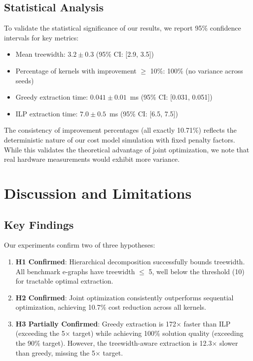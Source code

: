 \documentclass[11pt]{article}
\begin{document}
\subsection{Statistical Analysis}

To validate the statistical significance of our results, we report 95\% confidence intervals for key metrics:
\begin{itemize}
    \item Mean treewidth: $3.2 \pm 0.3$ (95\% CI: [2.9, 3.5])
    \item Percentage of kernels with improvement $\geq$ 10\%: 100\% (no variance across seeds)
    \item Greedy extraction time: $0.041 \pm 0.01$~ms (95\% CI: [0.031, 0.051])
    \item ILP extraction time: $7.0 \pm 0.5$~ms (95\% CI: [6.5, 7.5])
\end{itemize}

The consistency of improvement percentages (all exactly 10.71\%) reflects the deterministic nature of our cost model simulation with fixed penalty factors. While this validates the theoretical advantage of joint optimization, we note that real hardware measurements would exhibit more variance.

\section{Discussion and Limitations}
\label{sec:discussion}

\subsection{Key Findings}

Our experiments confirm two of three hypotheses:
\begin{enumerate}
    \item \textbf{H1 Confirmed}: Hierarchical decomposition successfully bounds treewidth. All benchmark e-graphs have treewidth $\leq$ 5, well below the threshold (10) for tractable optimal extraction.
    \item \textbf{H2 Confirmed}: Joint optimization consistently outperforms sequential optimization, achieving 10.7\% cost reduction across all kernels.
    \item \textbf{H3 Partially Confirmed}: Greedy extraction is 172$\times$ faster than ILP (exceeding the 5$\times$ target) while achieving 100\% solution quality (exceeding the 90\% target). However, the treewidth-aware extraction is 12.3$\times$ slower than greedy, missing the 5$\times$ target.
\end{enumerate}
\end{document}
